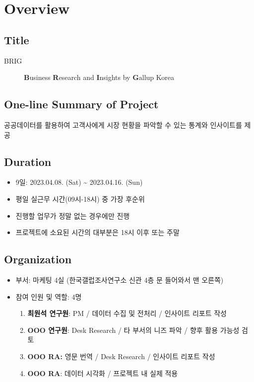 \documentclass[
]{book}
\providecommand{\tightlist}{%
  \setlength{\itemsep}{0pt}\setlength{\parskip}{0pt}}
\begin{document}
\hypertarget{overview}{%
\chapter{Overview}\label{overview}}

\hypertarget{title}{%
\section{Title}\label{title}}

\begin{description}
\item[BRIG]
\textbf{B}usiness \textbf{R}esearch and \textbf{I}nsights by \textbf{G}allup Korea
\end{description}

\hypertarget{one-line-summary-of-project}{%
\section{One-line Summary of Project}\label{one-line-summary-of-project}}

공공데이터를 활용하여 고객사에게 시장 현황을 파악할 수 있는 통계와 인사이트를 제공

\hypertarget{duration}{%
\section{Duration}\label{duration}}

\begin{itemize}
\tightlist
\item
  9일: 2023.04.08. (Sat) \textasciitilde{} 2023.04.16. (Sun)
\item
  평일 실근무 시간(09시-18시) 중 가장 후순위
\item
  진행할 업무가 정말 없는 경우에만 진행
\item
  프로젝트에 소요된 시간의 대부분은 18시 이후 또는 주말
\end{itemize}

\hypertarget{organization}{%
\section{Organization}\label{organization}}

\begin{itemize}
\item
  부서: 마케팅 4실 (한국갤럽조사연구소 신관 4층 문 들어와서 맨 오른쪽)
\item
  참여 인원 및 역할: 4명

  \begin{enumerate}
  \def\labelenumi{\arabic{enumi}.}
  \tightlist
  \item
    \textbf{최원석 연구원}: PM / 데이터 수집 및 전처리 / 인사이트 리포트 작성
  \item
    \textbf{OOO 연구원}: Desk Research / 타 부서의 니즈 파악 / 향후 활용 가능성 검토
  \item
    \textbf{OOO RA:} 영문 번역 / Desk Research / 인사이트 리포트 작성
  \item
    \textbf{OOO RA}: 데이터 시각화 / 프로젝트 내 실제 적용
  \end{enumerate}
\end{itemize}
\end{document}
